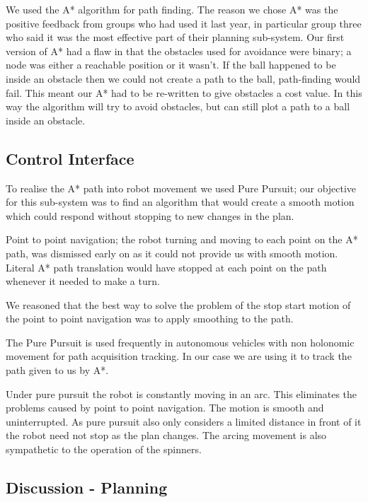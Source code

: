 
We used the A* algorithm for path finding.  The reason we chose A* was the
positive feedback from groups who had used it last year, in particular group
three who said it was the most effective part of their planning sub-system.
Our first version of A* had a flaw in that the obstacles used for avoidance
were binary; a node was either a reachable position or it wasn't. 
If the ball happened to be inside an obstacle then we could not create a path
to the ball, path-finding would fail. This meant our A* had to be re-written to
give obstacles a cost value. In this way the algorithm will try to
avoid obstacles, but can still plot a path to a ball inside an obstacle.

\subsection{Control Interface}

To realise the A* path into robot movement we used Pure Pursuit;
our objective for this sub-system was to find an algorithm that
would create a smooth motion which could respond without stopping to
new changes in the plan.

Point to point navigation; the robot turning and moving to each point on the A*
path, was dismissed early on as it could not provide us with smooth motion.
Literal A* path translation would have stopped at each point on the path
whenever it needed to make a turn.

We reasoned that the best way to solve the problem of the stop start motion of
the point to point navigation was to apply smoothing to the path. 

The Pure Pursuit is used frequently in autonomous vehicles with non holonomic
movement for path acquisition tracking\cite{agvpp}\cite{coulterpp}. In our case
we are using it to track the path given to us by A*.

Under pure pursuit the robot is constantly moving in an arc. This
eliminates the problems caused by point to point navigation. The motion is
smooth and uninterrupted. As pure pursuit also only considers a limited distance
in front of it the robot need not stop as the plan changes. The arcing movement
is also sympathetic to the operation of the spinners.

\subsection{Discussion - Planning}

